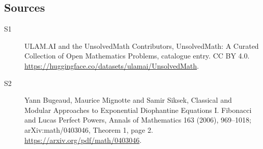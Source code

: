 \documentclass[11pt]{article}
\begin{document}
\subsection{Sources}
\begin{description}
\item[\hypertarget{source:statement:1}{S1}] ULAM.AI and the UnsolvedMath Contributors, UnsolvedMath: A Curated Collection of Open Mathematics Problems, catalogue entry. CC BY 4.0. \url{https://huggingface.co/datasets/ulamai/UnsolvedMath}.
\item[\hypertarget{source:statement:2}{S2}] Yann Bugeaud, Maurice Mignotte and Samir Siksek, Classical and Modular Approaches to Exponential Diophantine Equations I. Fibonacci and Lucas Perfect Powers, Annals of Mathematics 163 (2006), 969--1018; arXiv:math/0403046, Theorem 1, page 2. \url{https://arxiv.org/pdf/math/0403046}.
\end{description}
\label{end:statement}
\end{document}
